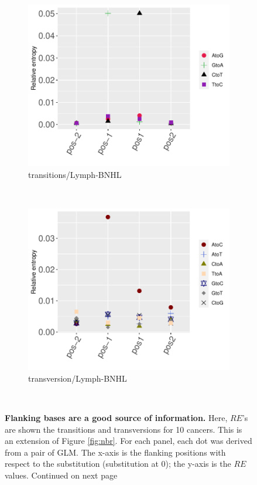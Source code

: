 \begin{figure}[ht!]
    \begin{subfigure}{.5\textwidth}
    \includegraphics[scale=0.63]{graphics/nbr_transitions_Lymph-BNHL.pdf}
    \caption{transitions/Lymph-BNHL}
    \label{fig:transitions_lymph-bnhl}
    \end{subfigure}
    ~
    \begin{subfigure}{.5\textwidth}
    \includegraphics[scale=0.63]{graphics/nbr_transversion_Lymph-BNHL.pdf}
    \caption{transversion/Lymph-BNHL}
    \label{fig:transversion_lymph-bnhl}
    \end{subfigure} \\
    \caption{\textbf{Flanking bases are a good source of information.} Here, $RE$'s are shown the transitions and transversions for 10 cancers. This is an extension of Figure \ref{fig:nbr}. For each panel, each dot was derived from a pair of GLM. The x-axis is the flanking positions with respect to the substitution (substitution at 0); the y-axis is the $RE$ values. Continued on next page}
\end{figure}

